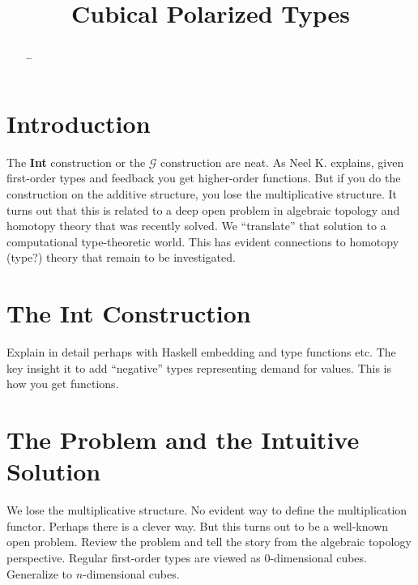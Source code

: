 \documentclass[authoryear,preprint]{sigplanconf}
\begin{document}
\lstset{breaklines=true, breakatwhitespace=true}
\lstset{numbers=none, numbersep=5pt, stepnumber=2, numberstyle=\scriptsize}
\lstset{rangeprefix=/*!\ , rangesuffix=\ !*\/, includerangemarker=false}

\title{Cubical Polarized Types}
\authorinfo{}{}{}
\maketitle

\begin{abstract}
\ldots
\end{abstract}

\section{Introduction}

The \textbf{Int} construction or the $\mathcal{G}$ construction are neat. As
Neel K. explains, given first-order types and feedback you get higher-order
functions. But if you do the construction on the additive structure, you lose
the multiplicative structure. It turns out that this is related to a deep
open problem in algebraic topology and homotopy theory that was recently
solved. We ``translate'' that solution to a computational type-theoretic
world. This has evident connections to homotopy (type?) theory that remain to
be investigated.

\section{The \textbf{Int} Construction} 

Explain in detail perhaps with Haskell embedding and type functions etc. The
key insight it to add ``negative'' types representing demand for values. This
is how you get functions.

\section{The Problem and the Intuitive Solution}

We lose the multiplicative structure. No evident way to define the
multiplication functor. Perhaps there is a clever way. But this turns out to
be a well-known open problem. Review the problem and tell the story from the
algebraic topology perspective. Regular first-order types are viewed as
$0$-dimensional cubes. Generalize to $n$-dimensional cubes.
\end{document}
